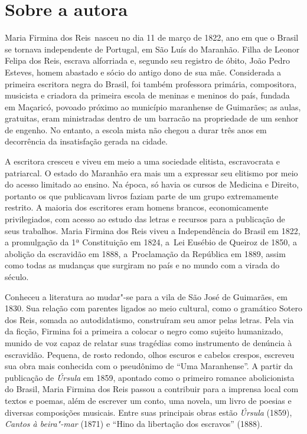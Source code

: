 
\section{Sobre a autora}

Maria Firmina dos Reis~nasceu no dia 11 de março de 1822, ano
em que o Brasil se tornava independente de Portugal, em São Luís do
Maranhão. Filha de Leonor Felipa dos Reis, escrava alforriada e, segundo
seu registro de óbito, João Pedro Esteves, homem abastado e sócio do
antigo dono de sua mãe. Considerada a primeira escritora negra do
Brasil, foi também professora primária, compositora, musicista e
criadora da primeira escola de meninas e meninos do país, fundada em
Maçaricó, povoado próximo ao município maranhense de Guimarães; as
aulas, gratuitas, eram ministradas dentro de um barracão na propriedade
de um senhor de engenho. No entanto, a escola mista não chegou a durar
três anos em decorrência da insatisfação gerada na cidade.

A escritora cresceu e viveu em meio a uma
sociedade elitista, escravocrata e patriarcal. O estado do Maranhão era
mais um a expressar seu elitismo por meio do acesso limitado ao ensino.
Na época, só havia os cursos de Medicina e Direito, portanto os que
publicavam livros faziam parte de um grupo extremamente restrito. A
maioria dos escritores eram homens brancos, economicamente
privilegiados, com acesso ao estudo das letras e recursos para a
publicação de seus trabalhos. Maria Firmina dos Reis viveu a
Independência do Brasil em 1822, a promulgação da 1ª Constituição em
1824, a~Lei Eusébio de Queiroz de 1850, a abolição da escravidão em
1888, a~Proclamação da República em 1889, assim como todas as mudanças
que surgiram no país e no mundo com a virada do século.

Conheceu a literatura ao mudar"-se para a vila de São José
de Guimarães, em 1830. Sua relação com parentes ligados ao meio
cultural, como o gramático Sotero dos Reis, somada ao autodidatismo,
construíram seu amor pelas letras. Pela via da ficção, Firmina foi a
primeira a colocar o negro como sujeito humanizado, munido de voz capaz
de relatar suas tragédias como instrumento de denúncia à escravidão.
Pequena, de rosto redondo, olhos escuros e cabelos crespos, escreveu sua
obra mais conhecida com o pseudônimo de ``Uma Maranhense''. A partir da
publicação de \emph{Úrsula} em 1859, apontado como o primeiro romance
abolicionista do Brasil, Maria Firmina dos Reis passou a contribuir para
a imprensa local com textos e poemas, além de escrever um conto, uma
novela, um livro de poesias e diversas composições musicais. Entre suas
principais obras estão \emph{Úrsula} (1859), \emph{Cantos à beira"-mar}
(1871) e ``Hino da libertação dos escravos'' (1888).

